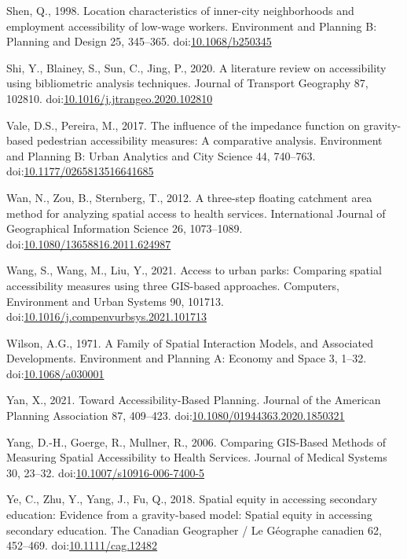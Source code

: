 \documentclass[]{elsarticle} %
\newlength{\cslhangindent}
\newlength{\cslentryspacingunit} %
\newenvironment{CSLReferences}[2] %
 {%
  \setlength{\parindent}{0pt}
  \ifodd #1
  \let\oldpar\par
  \def\par{\hangindent=\cslhangindent\oldpar}
  \fi
  \setlength{\parskip}{#2\cslentryspacingunit}
 }%
 {}
\begin{document}
\begin{CSLReferences}{1}{0}
\leavevmode{}%
Shen, Q., 1998. Location characteristics of inner-city neighborhoods and
employment accessibility of low-wage workers. Environment and Planning
B: Planning and Design 25, 345--365.
doi:\href{https://doi.org/10.1068/b250345}{10.1068/b250345}

\leavevmode{}%
Shi, Y., Blainey, S., Sun, C., Jing, P., 2020. A literature review on
accessibility using bibliometric analysis techniques. Journal of
Transport Geography 87, 102810.
doi:\href{https://doi.org/10.1016/j.jtrangeo.2020.102810}{10.1016/j.jtrangeo.2020.102810}

\leavevmode{}%
Vale, D.S., Pereira, M., 2017. The influence of the impedance function
on gravity-based pedestrian accessibility measures: {A} comparative
analysis. Environment and Planning B: Urban Analytics and City Science
44, 740--763.
doi:\href{https://doi.org/10.1177/0265813516641685}{10.1177/0265813516641685}

\leavevmode{}%
Wan, N., Zou, B., Sternberg, T., 2012. A three-step floating catchment
area method for analyzing spatial access to health services.
International Journal of Geographical Information Science 26,
1073--1089.
doi:\href{https://doi.org/10.1080/13658816.2011.624987}{10.1080/13658816.2011.624987}

\leavevmode{}%
Wang, S., Wang, M., Liu, Y., 2021. Access to urban parks: {Comparing}
spatial accessibility measures using three {GIS}-based approaches.
Computers, Environment and Urban Systems 90, 101713.
doi:\href{https://doi.org/10.1016/j.compenvurbsys.2021.101713}{10.1016/j.compenvurbsys.2021.101713}

\leavevmode{}%
Wilson, A.G., 1971. A Family of Spatial Interaction Models, and
Associated Developments. Environment and Planning A: Economy and Space
3, 1--32. doi:\href{https://doi.org/10.1068/a030001}{10.1068/a030001}

\leavevmode{}%
Yan, X., 2021. Toward Accessibility-Based Planning. Journal of the
American Planning Association 87, 409--423.
doi:\href{https://doi.org/10.1080/01944363.2020.1850321}{10.1080/01944363.2020.1850321}

\leavevmode{}%
Yang, D.-H., Goerge, R., Mullner, R., 2006. Comparing {GIS}-{Based}
{Methods} of {Measuring} {Spatial} {Accessibility} to {Health}
{Services}. Journal of Medical Systems 30, 23--32.
doi:\href{https://doi.org/10.1007/s10916-006-7400-5}{10.1007/s10916-006-7400-5}

\leavevmode{}%
Ye, C., Zhu, Y., Yang, J., Fu, Q., 2018. Spatial equity in accessing
secondary education: {Evidence} from a gravity-based model: {Spatial}
equity in accessing secondary education. The Canadian Geographer / Le
Géographe canadien 62, 452--469.
doi:\href{https://doi.org/10.1111/cag.12482}{10.1111/cag.12482}

\end{CSLReferences}
\end{document}
